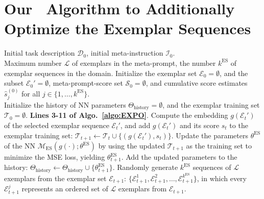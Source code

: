 \onecolumn

\section{Our \alges~Algorithm to Additionally Optimize the Exemplar Sequences}
\label{app:expo:es}

\begin{algorithm}[H]
\begin{algorithmic}[1]
    \INPUT Initial task description $\mathcal{D}_0$, initial meta-instruction $\mathcal{I}_0$.\\
    Maximum number \(\mathcal{L}\) of exemplars in the meta-prompt, the number \(k^{\text{ES}}\) of exemplar sequences in the domain.
    \STATE Initialize the exemplar set $\mathcal{E}_0 = \emptyset$, and the subset $\mathcal{E}_0' = \emptyset$, meta-prompt-score set $\mathcal{S}_0 = \emptyset$, and cumulative score estimates $\hat{s}_j^{(0)}$ for all $j \in \{1, \ldots, k^{\text{ES}}\}$.
    \\
    Initialize the history of NN parameters \(\Theta_{\text{history}} = \emptyset\), 
    and the exemplar training set \(\mathcal{T}_0 = \emptyset\).
        \STATE \textbf{Lines 3-11 of Algo.~\ref{algo:EXPO}}.
        \STATE Compute the embedding \(g(\mathcal{E}_t')\) of the selected exemplar sequence \(\mathcal{E}_t'\), and add \(g(\mathcal{E}_t')\) and its score \(s_t\) to the exemplar training set:  $\mathcal{T}_{t+1} \gets \mathcal{T}_t \cup \{(g(\mathcal{E}_t'), s_t)\}$.
        \STATE Update the parameters $\theta^{\text{ES}}$ of the NN $\mathcal{M}_{\text{ES}}(g(\cdot); \theta^{\text{ES}})$ by using the updated $\mathcal{T}_{t+1}$ as the training set to minimize the MSE loss, yielding $\theta^{\text{ES}}_{t+1}$.
        \STATE Add the updated parameters to the history: $\Theta_{\text{history}} \gets \Theta_{\text{history}} \cup \{\theta^{\text{ES}}_{t+1}\}$.
            \STATE Randomly generate \(k^{\text{ES}}\) sequences of $\mathcal{L}$ exemplars from the exemplar set \(\mathcal{E}_{t+1}\): \(\{\mathcal{E}^{1}_{t+1}, \mathcal{E}^{2}_{t+1}, \ldots, \mathcal{E}^{k^{\text{ES}}}_{t+1}\}\), in which every \(\mathcal{E}^{j}_{t+1}\) represents an ordered set of \(\mathcal{L}\) exemplars from \(\mathcal{E}_{t+1}\).


\end{algorithmic}
\end{algorithm}
